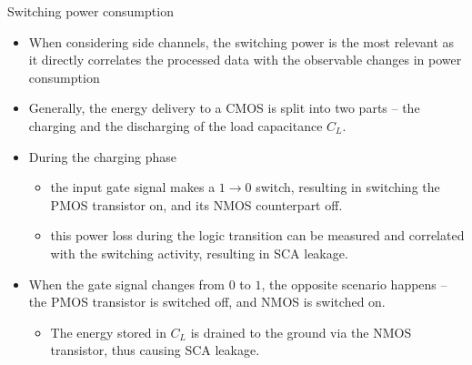 \begin{frame}{Switching power consumption}
    \begin{itemize}
        \item When considering side channels, the switching power is the most relevant as it directly correlates the processed data with the observable changes in power consumption
        \item Generally, the energy delivery to a CMOS is split into two parts -- the charging and the discharging of the load capacitance $C_L$.
        \item During the charging phase
        \begin{itemize}
            \item the input gate signal makes a $1 \rightarrow 0$ switch, resulting in switching the PMOS transistor on, and its NMOS counterpart off.
            \item this power loss during the logic transition can be measured and correlated with the switching activity, resulting in SCA leakage.
        \end{itemize}
        \item When the gate signal changes from $0$ to $1$, the opposite scenario happens -- the PMOS transistor is switched off, and NMOS is switched on.
        \begin{itemize}
            \item The energy stored in $C_L$ is drained to the ground via the NMOS transistor, thus causing SCA leakage.
        \end{itemize}
    \end{itemize}
\end{frame}

